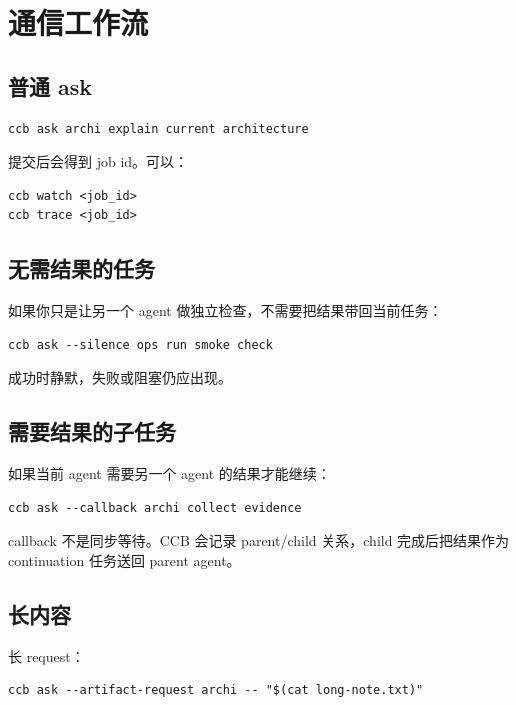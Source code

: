 \chapter{通信工作流}

\section{普通 ask}

\begin{lstlisting}
ccb ask archi explain current architecture
\end{lstlisting}

提交后会得到 job id。可以：

\begin{lstlisting}
ccb watch <job_id>
ccb trace <job_id>
\end{lstlisting}

\section{无需结果的任务}

如果你只是让另一个 agent 做独立检查，不需要把结果带回当前任务：

\begin{lstlisting}
ccb ask --silence ops run smoke check
\end{lstlisting}

成功时静默，失败或阻塞仍应出现。

\section{需要结果的子任务}

如果当前 agent 需要另一个 agent 的结果才能继续：

\begin{lstlisting}
ccb ask --callback archi collect evidence
\end{lstlisting}

callback 不是同步等待。CCB 会记录 parent/child 关系，child 完成后把结果作为 continuation 任务送回 parent agent。

\section{长内容}

长 request：

\begin{lstlisting}
ccb ask --artifact-request archi -- "$(cat long-note.txt)"
\end{lstlisting}

